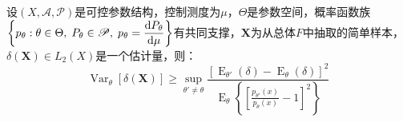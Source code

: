 \begin{theorem}
	\label{theo:Hammersley-Chapman-RobbinsInequality}
	设$(X,\mathscr{A},\mathscr{P})$是可控参数结构，控制测度为$\mu$，$\Theta$是参数空间，概率函数族$\left\{p_{\theta}:\theta\in\Theta,\;P_{\theta}\in\mathscr{P},\;p_{\theta}=\dfrac{\mathop{}\!\mathrm{d} P_{\theta}}{\mathop{}\!\mathrm{d}\mu}\right\}$有共同支撑，$\mathbf{X}$为从总体$F$中抽取的简单样本，$\delta(\mathbf{X})\in L_2(X)$是一个估计量，则：
	\begin{equation*}
		\operatorname{Var}_{\theta}[\delta(\mathbf{X})]\geqslant\sup_{\theta'\ne\theta}\dfrac{[\operatorname{E}_{\theta'}(\delta)-\operatorname{E}_{\theta}(\delta)]^2}{\operatorname{E}_{\theta}\left\{\left[\frac{p_{\theta'}(x)}{p_{\theta}(x)}-1\right]^2\right\}}
	\end{equation*}
\end{theorem}
